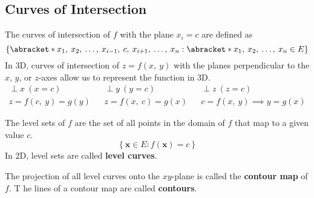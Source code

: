 \documentclass{article}
\begin{document}
\subsection{Curves of Intersection}
\begin{definition}
    The curves of intersection of \(f\) with the plane \(x_i = c\) are defined as
    \begin{equation*}
        \left\{ \abracket*{x_1,\: x_2,\: \ldots,\: x_{i - 1},\: c,\: x_{i + 1},\: \ldots,\: x_n} : \abracket*{x_1,\: x_2,\: \ldots,\: x_n} \in E \right\}
    \end{equation*}
    In 3D, curves of intersection of \(z = f\left( x,\: y \right)\) with the planes perpendicular to the
    \(x\), \(y\), or \(z\)-axes allow us to represent the function in 3D.
    \begin{align*}
        \perp x \: (x = c)                             &  & \perp y \: (y = c)                             &  & \perp z \: (z = c)                                        \\
        z = f\left( c,\: y \right) = g\left( y \right) &  & z = f\left( x,\: c \right) = g\left( x \right) &  & c = f\left( x,\: y \right) \implies y = g\left( x \right)
    \end{align*}
\end{definition}
\begin{definition}
    The level sets of \(f\) are the set of all points in the domain of \(f\) that map to a given value \(c\).
    \begin{equation*}
        \left\{ \symbf{x} \in E : f\left( \symbf{x} \right) = c \right\}
    \end{equation*}
    In 2D, level sets are called \textbf{level curves}.
\end{definition}
\begin{definition}
    The projection of all level curves onto the \(xy\)-plane is called the \textbf{contour map} of \(f\). T
    he lines of a contour map are called \textbf{contours}.
\end{definition}
\end{document}
